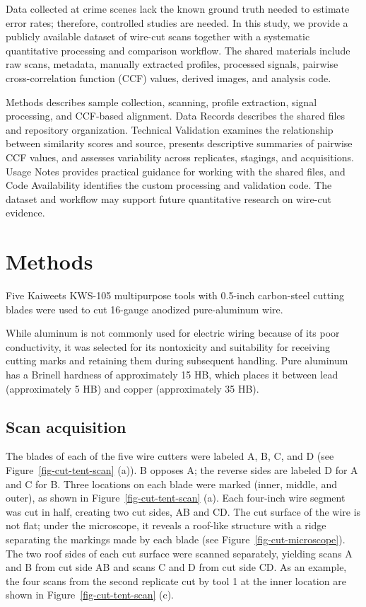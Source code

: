 \documentclass[11pt,a4paper]{article}
\begin{document}
Data collected at crime scenes lack the known ground truth needed to
estimate error rates; therefore, controlled studies are needed. In this
study, we provide a publicly available dataset of wire-cut scans
together with a systematic quantitative processing and comparison
workflow. The shared materials include raw scans, metadata, manually
extracted profiles, processed signals, pairwise cross-correlation
function (CCF) values, derived images, and analysis code.

Methods describes sample collection, scanning, profile extraction,
signal processing, and CCF-based alignment. Data Records describes the
shared files and repository organization. Technical Validation examines
the relationship between similarity scores and source, presents
descriptive summaries of pairwise CCF values, and assesses variability
across replicates, stagings, and acquisitions. Usage Notes provides
practical guidance for working with the shared files, and Code
Availability identifies the custom processing and validation code. The
dataset and workflow may support future quantitative research on
wire-cut evidence.

\section*{Methods}\label{sec-methods}

Five Kaiweets KWS-105 multipurpose tools with 0.5-inch carbon-steel
cutting blades were used to cut 16-gauge anodized pure-aluminum wire.

While aluminum is not commonly used for electric wiring because of its
poor conductivity, it was selected for its nontoxicity and suitability
for receiving cutting marks and retaining them during subsequent
handling. Pure aluminum has a Brinell hardness of approximately 15 HB,
which places it between lead (approximately 5 HB) and copper
(approximately 35 HB).

\subsection*{Scan acquisition}\label{sec-cutting-wires}

The blades of each of the five wire cutters were labeled A, B, C, and D
(see Figure~\ref{fig-cut-tent-scan} (a)). B opposes A; the reverse sides
are labeled D for A and C for B. Three locations on each blade were
marked (inner, middle, and outer), as shown in
Figure~\ref{fig-cut-tent-scan} (a). Each four-inch wire segment was cut
in half, creating two cut sides, AB and CD. The cut surface of the wire
is not flat; under the microscope, it reveals a roof-like structure with
a ridge separating the markings made by each blade (see
Figure~\ref{fig-cut-microscope}). The two roof sides of each cut surface
were scanned separately, yielding scans A and B from cut side AB and
scans C and D from cut side CD. As an example, the four scans from the
second replicate cut by tool 1 at the inner location are shown in
Figure~\ref{fig-cut-tent-scan} (c).
\end{document}
